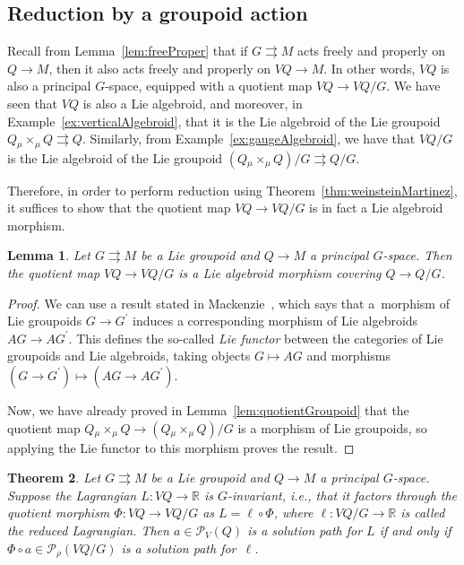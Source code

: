 \documentclass[10pt,a4paper]{amsart}
\numberwithin{equation}{section}
\newtheorem{Theorem}{Theorem}[section]
\newtheorem{Lemma}[Theorem]{Lemma}
\begin{document}
\subsection{Reduction by a groupoid action}

Recall from Lemma~\ref{lem:freeProper} that if $ G \rightrightarrows M $ acts freely and properly on $ Q \rightarrow M $, then it also acts freely and properly on $ V Q \rightarrow M $. In other words, $ V Q $ is also a principal $G$-space, equipped with a quotient map $ V Q \rightarrow V Q / G $. We have seen that $ V Q $ is also a Lie algebroid, and moreover, in Example~\ref{ex:verticalAlgebroid}, that it is the Lie algebroid of the Lie groupoid $ Q \mathbin{ _\mu \times _\mu } Q \rightrightarrows Q $. Similarly, from Example~\ref{ex:gaugeAlgebroid}, we have that $ V Q / G $ is the Lie algebroid of the Lie groupoid $ (Q \mathbin{ _\mu \times _\mu } Q)/G \rightrightarrows Q/G $.

Therefore, in order to perform reduction using Theorem~\ref{thm:weinsteinMartinez}, it suf\/f\/ices to show that the quotient map $ V Q \rightarrow V Q / G $ is in fact a Lie algebroid morphism.

\begin{Lemma} \label{lem:quotientMorphism}
Let $ G \rightrightarrows M $ be a Lie groupoid and $ Q \rightarrow M $ a principal $G$-space. Then the quotient map $ V Q \rightarrow V Q / G $ is a Lie algebroid morphism covering $ Q \rightarrow Q / G $.
\end{Lemma}

\begin{proof}We can use a result stated in Mackenzie~\cite[Proposition~4.3.4]{Mackenzie2005}, which says that a~morphism of Lie groupoids $ G \rightarrow G ^\prime $ induces a corresponding morphism of Lie algebroids $ A G \rightarrow A G ^\prime $. This def\/ines the so-called \emph{Lie functor} between the categories of Lie groupoids and Lie algebroids, taking objects $ G \mapsto A G $ and morphisms $ ( G \rightarrow G ^\prime ) \mapsto ( A G \rightarrow A G
 ^\prime ) $.

Now, we have already proved in Lemma~\ref{lem:quotientGroupoid} that the quotient map $ Q \mathbin{ _\mu \times _\mu } Q \rightarrow ( Q \mathbin{ _\mu \times _\mu } Q ) / G $ is a morphism of Lie groupoids, so applying the Lie functor to this morphism proves the result.
\end{proof}

\begin{Theorem} \label{thm:reduction}
Let $ G \rightrightarrows M $ be a Lie groupoid and $ Q \rightarrow M $ a principal $G$-space. Suppose the Lagrangian $ L \colon V Q \rightarrow \mathbb{R} $ is $G$-invariant, i.e., that it factors through the quotient morphism $ \Phi \colon V Q \rightarrow V Q / G $ as $ L = \ell \circ \Phi $, where $ \ell \colon V Q / G \rightarrow \mathbb{R} $ is called the reduced Lagrangian. Then $a \in \mathcal{P} _V (Q) $ is a solution path for $L$ if and only if $ \Phi \circ a \in \mathcal{P} _\rho ( V Q / G ) $ is a solution path for~$ \ell $.
\end{Theorem}
\end{document}
